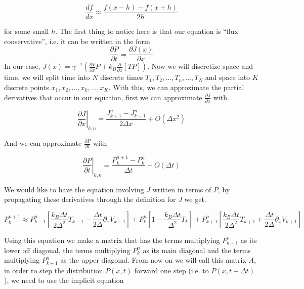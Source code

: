 \documentclass[11pt]{article} %
\begin{document}
\begin{equation}
\frac{d f}{d x} \approx \frac{f(x - h) - f(x + h)}{2h}
\end{equation}

for some small $h$. The first thing to notice here is that our equation is ``flux conservative'', i.e. it can be written in the form 
$$ \frac{\partial P}{\partial t} = \frac{\partial J(x)}{\partial x} $$
In our case, $J(x) = \gamma^{-1} \left ( \frac{\partial V}{\partial x} P + k_B \frac{\partial}{\partial x} [T P] \right ) $. Now we will discretize space and time, we will split time into $N$ discrete times  $T_1, T_2, ..., T_n, ..., T_N$ and space into $K$ discrete points $x_1, x_2, ..., x_k, ..., x_K$. With this, we can approximate the partial derivatives that occur in our equation, first we can approximate $\frac{\partial J}{\partial x}$ with.

\begin{equation}
\left. \frac{\partial J}{\partial x} \right|_{k, n} = \frac{J_{k+1}^n - J_{k-1}^n}{2 \Delta x} + O(\Delta x^2) 
\end{equation}

And we can approximate $\frac{\partial P}{\partial t}$ with

\begin{equation}
\left. \frac{\partial P}{\partial t} \right|_{k, n} = \frac{P_k^{n+1} - P_k^n}{\Delta t} + O(\Delta t)
\end{equation}

We would like to have the equation involving $J$ written in terms of $P$, by propagating these derivatives through the definition for $J$ we get.

\begin{equation}
P_{k}^{n+1} \approx P_{k-1}^n \left [ \frac{k_B \Delta t}{2 \Delta^2} T_{k-1} - \frac{\Delta t}{2 \Delta} \partial_x V_{k-1} \right ] +
 P_k^n \left [1 - \frac{k_B \Delta t}{\Delta^2} T_k \right] +
 P_{k+1}^n \left [ \frac{k_B \Delta t}{2 \Delta^2}T_{k+1} + \frac{\Delta t}{2 \Delta} \partial_x V_{k+1} \right]
\end{equation}

Using this equation we make a matrix that has the terms multiplying $P_{k-1}^n$ as its lower off diagonal, the terms multiplying $P_k^n$ as its main diagonal and the terms multiplying $P_{k+1}^n$ as the upper diagonal. From now on we will call this matrix $A$, in order to step the distribution $P(x, t)$ forward one step (i.e. to $P(x, t + \Delta t)$), we need to use the implicit equation 
\end{document}
